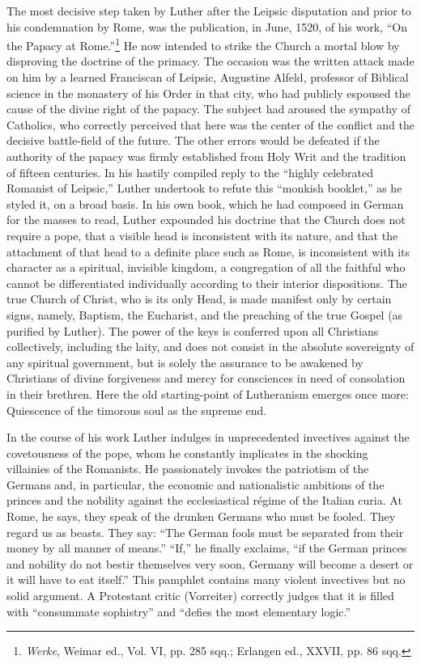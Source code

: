 The most decisive step taken by Luther after the Leipsic disputation and
prior to his condemnation by Rome, was the publication, in
June, 1520, of his work, “On the Papacy at Rome.”\footnote
{\textit{Werke}, Weimar ed., Vol. VI, pp. 285 sqq.; Erlangen ed., XXVII, pp. 86 sqq.}
He now intended to strike the Church a mortal blow by disproving the doctrine
of the primacy. The occasion was the written attack made on him by
a learned Franciscan of Leipsic, Augustine Alfeld, professor of Biblical
science in the monastery of his Order in that city, who had
publicly espoused the cause of the divine right of the papacy. The subject
had aroused the sympathy of Catholics, who correctly perceived
that here was the center of the conflict and the decisive battle-field
of the future. The other errors would be defeated if the authority of
the papacy was firmly established from Holy Writ and the tradition
of fifteen centuries. In his hastily compiled reply to the “highly
celebrated Romanist of Leipsic,” Luther undertook to refute this
“monkish booklet,” as he styled it, on a broad basis. In his own book,
which he had composed in German for the masses to read, Luther
expounded his doctrine that the Church does not require a pope,
that a visible head is inconsistent with its nature, and that the attachment
of that head to a definite place such as Rome, is inconsistent
with its character as a spiritual, invisible kingdom, a congregation of
all the faithful who cannot be differentiated individually according to
their interior dispositions. The true Church of Christ,
who is its only Head, is made manifest only by certain signs, namely,
Baptism, the Eucharist, and the preaching of the true Gospel (as
purified by Luther). The power of the keys is conferred upon all
Christians collectively, including the laity, and does not consist in the
absolute sovereignty of any spiritual government, but is solely the
assurance to be awakened by Christians of divine forgiveness and
mercy for consciences in need of consolation in their brethren. Here
the old starting-point of Lutheranism emerges once more: Quiescence
of the timorous soul as the supreme end.

In the course of his work Luther indulges in unprecedented invectives against
the covetousness of the pope, whom he constantly
implicates in the shocking villainies of the Romanists. He passionately
invokes the patriotism of the Germans and, in particular, the economic
and nationalistic ambitions of the princes and the nobility against
the ecclesiastical régime of the Italian curia. At Rome, he
says, they speak of the drunken Germans who must be fooled. They
regard us as beasts. They say: “The German fools must be separated
from their money by all manner of means.” “If,” he finally exclaims,
“if the German princes and nobility do not bestir themselves very
soon, Germany will become a desert or it will have to eat itself.”
This pamphlet contains many violent invectives but no solid argument. A
Protestant critic (Vorreiter) correctly judges that it is
filled with “consummate sophistry” and “defies the most elementary
logic.”


